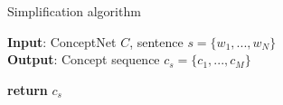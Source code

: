 
\begin{algorithm}[tb]
\small
\caption{Simplification algorithm}
\label{alg:simplify}
\textbf{Input}: ConceptNet $C$, sentence $s=\{w_1, ..., w_N\}$\\
\textbf{Output}: Concept sequence $c_s=\{c_1, ..., c_M\}$
\begin{algorithmic}[1] %
      \EndIf
    \EndFor
  \EndFor
  \State \textbf{return} {$c_s$}
  \EndProcedure
\end{algorithmic}
\end{algorithm}

